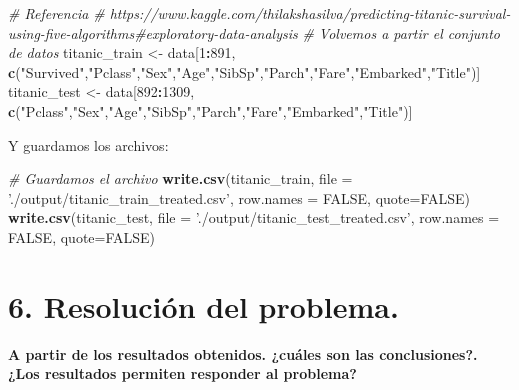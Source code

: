 \documentclass[]{article}
\newenvironment{Shaded}{\begin{snugshade}}{\end{snugshade}}
\newcommand{\KeywordTok}[1]{\textcolor[rgb]{0.13,0.29,0.53}{\textbf{#1}}}
\newcommand{\DataTypeTok}[1]{\textcolor[rgb]{0.13,0.29,0.53}{#1}}
\newcommand{\DecValTok}[1]{\textcolor[rgb]{0.00,0.00,0.81}{#1}}
\newcommand{\StringTok}[1]{\textcolor[rgb]{0.31,0.60,0.02}{#1}}
\newcommand{\CommentTok}[1]{\textcolor[rgb]{0.56,0.35,0.01}{\textit{#1}}}
\newcommand{\OtherTok}[1]{\textcolor[rgb]{0.56,0.35,0.01}{#1}}
\newcommand{\OperatorTok}[1]{\textcolor[rgb]{0.81,0.36,0.00}{\textbf{#1}}}
\newcommand{\NormalTok}[1]{#1}
\begin{document}
\begin{Shaded}
\begin{Highlighting}[]
\CommentTok{# Referencia}
\CommentTok{# https://www.kaggle.com/thilakshasilva/predicting-titanic-survival-using-five-algorithms#exploratory-data-analysis}
\CommentTok{# Volvemos a partir el conjunto de datos}
\NormalTok{titanic_train <-}\StringTok{ }\NormalTok{data[}\DecValTok{1}\OperatorTok{:}\DecValTok{891}\NormalTok{, }\KeywordTok{c}\NormalTok{(}\StringTok{"Survived"}\NormalTok{,}\StringTok{"Pclass"}\NormalTok{,}\StringTok{"Sex"}\NormalTok{,}\StringTok{"Age"}\NormalTok{,}\StringTok{"SibSp"}\NormalTok{,}\StringTok{"Parch"}\NormalTok{,}\StringTok{"Fare"}\NormalTok{,}\StringTok{"Embarked"}\NormalTok{,}\StringTok{"Title"}\NormalTok{)]}
\NormalTok{titanic_test <-}\StringTok{ }\NormalTok{data[}\DecValTok{892}\OperatorTok{:}\DecValTok{1309}\NormalTok{, }\KeywordTok{c}\NormalTok{(}\StringTok{"Pclass"}\NormalTok{,}\StringTok{"Sex"}\NormalTok{,}\StringTok{"Age"}\NormalTok{,}\StringTok{"SibSp"}\NormalTok{,}\StringTok{"Parch"}\NormalTok{,}\StringTok{"Fare"}\NormalTok{,}\StringTok{"Embarked"}\NormalTok{,}\StringTok{"Title"}\NormalTok{)]}
\end{Highlighting}
\end{Shaded}

Y guardamos los archivos:

\begin{Shaded}
\begin{Highlighting}[]
\CommentTok{# Guardamos el archivo}
\KeywordTok{write.csv}\NormalTok{(titanic_train, }\DataTypeTok{file =} \StringTok{'./output/titanic_train_treated.csv'}\NormalTok{, }\DataTypeTok{row.names =} \OtherTok{FALSE}\NormalTok{, }\DataTypeTok{quote=}\OtherTok{FALSE}\NormalTok{)}
\KeywordTok{write.csv}\NormalTok{(titanic_test, }\DataTypeTok{file =} \StringTok{'./output/titanic_test_treated.csv'}\NormalTok{, }\DataTypeTok{row.names =} \OtherTok{FALSE}\NormalTok{, }\DataTypeTok{quote=}\OtherTok{FALSE}\NormalTok{)}
\end{Highlighting}
\end{Shaded}

\section{6. Resolución del problema.}\label{resolucion-del-problema.}

\textbf{A partir de los resultados obtenidos. ¿cuáles son las
conclusiones?. ¿Los resultados permiten responder al problema?}
\end{document}
